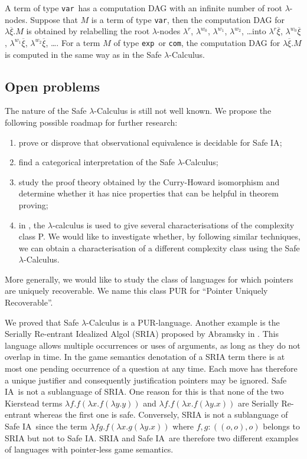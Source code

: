 \documentclass{llncs}
\newcommand\ialgol{\textsf{IA}}
\newcommand\iacom{\texttt{com}}
\newcommand\iaexp{\texttt{exp}}
\newcommand\iavar{\texttt{var}}
\begin{document}
A term of type \iavar\ has a computation DAG with an infinite number
of root $\lambda$-nodes. Suppose that $M$ is a term of type \iavar,
then the computation DAG for $\lambda \overline{\xi} . M$ is
obtained by relabelling the root $\lambda$-nodes $\lambda^r$,
$\lambda^{w_0}$, $\lambda^{w_1}$, $\lambda^{w_2}$, \ldots into
$\lambda^r \overline{\xi}$, $\lambda^{w_0} \overline{\xi}$,
$\lambda^{w_1} \overline{\xi}$, $\lambda^{w_2} \overline{\xi}$,
\ldots. For a term $M$  of type \iaexp\ or \iacom, the computation
DAG for $\lambda \overline{\xi} . M$ is computed in the same way as
in the Safe $\lambda$-Calculus.



\subsection{Open problems}

The nature of the Safe $\lambda$-Calculus is still not well known. We propose the following possible
roadmap for further research:
\begin{enumerate}
\item prove or disprove that observational equivalence is decidable for Safe \ialgol;
\item find a categorical interpretation of the Safe $\lambda$-Calculus;
\item study the proof theory obtained by the Curry-Howard isomorphism and determine whether it has nice properties that can be helpful in theorem proving;
\item in \cite{DBLP:conf/tlca/LeivantM93}, the $\lambda$-calculus is used to
give several characterisations of the complexity class P. We would
like to investigate whether, by following similar techniques, we can
obtain a characterisation of a different complexity class using the
Safe $\lambda$-Calculus.
\end{enumerate}


More generally, we would like to study the class of languages for
which pointers are uniquely recoverable. We name this class PUR for
``Pointer Uniquely Recoverable''.

We proved that Safe $\lambda$-Calculus is a PUR-language. Another
example is the Serially Re-entrant Idealized Algol (SRIA) proposed
by Abramsky  in \cite{abramsky:mchecking_ia}. This language allows
multiple occurrences or uses of arguments, as long as they do not
overlap in time. In the game semantics denotation of a SRIA term
there is at most one pending occurrence of a question at any time.
Each move has therefore a unique justifier and consequently
justification pointers may be ignored. Safe \ialgol\ is not a
sublanguage of SRIA. One reason for this is that none of the two
Kierstead terms $\lambda f . f (\lambda x . f (\lambda y .y ))$ and
$\lambda f . f (\lambda x . f (\lambda y .x ))$ are Serially
Re-entrant whereas the first one is safe. Conversely, SRIA is not a
sublanguage of Safe \ialgol\ since the term $\lambda f g. f (\lambda
x . g (\lambda y .x ))$ where $f,g:((o,o),o)$ belongs to SRIA but
not to Safe \ialgol. SRIA and Safe \ialgol\ are therefore two
different examples of languages with pointer-less game semantics.
\end{document}
